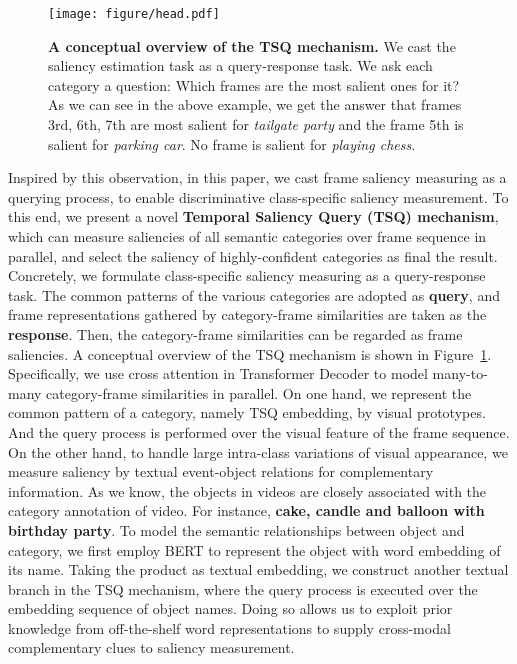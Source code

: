 \documentclass[runningheads]{llncs}
\newcommand{\figref}[1]{Figure~\ref{#1}}
\begin{document}
\begin{figure}[t] \centering \texttt{[image: figure/head.pdf]} \caption{\textbf{A conceptual overview of the TSQ mechanism.} We cast the saliency estimation task as a query-response task. We ask each category a question: Which frames are the most salient ones for it? As we can see in the above example, we get the answer that frames 3rd, 6th, 7th are most salient for \emph{tailgate party} and the frame 5th is salient for \emph{parking car}. No frame is salient for \emph{playing chess}.}
\label{Fig.head} \end{figure}
Inspired by this observation, in this paper, we cast frame saliency measuring as a querying process, to enable discriminative class-specific saliency measurement.
To this end, we present a novel \textbf{Temporal Saliency Query (TSQ) mechanism}, which can measure saliencies of all semantic categories over frame sequence in parallel, and select the saliency of highly-confident categories as final the result. 
Concretely, we formulate class-specific saliency measuring as a query-response task. The common patterns of the various categories are adopted as \textbf{query}, and frame representations gathered by category-frame similarities are taken as the \textbf{response}. Then, the category-frame similarities can be regarded as frame saliencies. A conceptual overview of the TSQ mechanism is shown in \figref{Fig.head}. Specifically, we use cross attention in Transformer Decoder \cite{transformer} to model many-to-many category-frame similarities in parallel. 
On one hand, we represent the common pattern of a category, namely TSQ embedding, by visual prototypes. And the query process is performed over the visual feature of the frame sequence. On the other hand, to handle large intra-class variations of visual appearance, we measure saliency by textual event-object relations for complementary information. As we know, the objects in videos are closely associated with the category annotation of video. For instance, \textbf{cake, candle and balloon with birthday party}. To model the semantic relationships between object and category, we first employ BERT \cite{bert} to represent the object with word embedding of its name. Taking the product as textual embedding, we construct another textual branch in the TSQ mechanism, where the query process is executed over the embedding sequence of object names. Doing so allows us to exploit prior knowledge from off-the-shelf word representations to supply cross-modal complementary clues to saliency measurement. 
\end{document}
